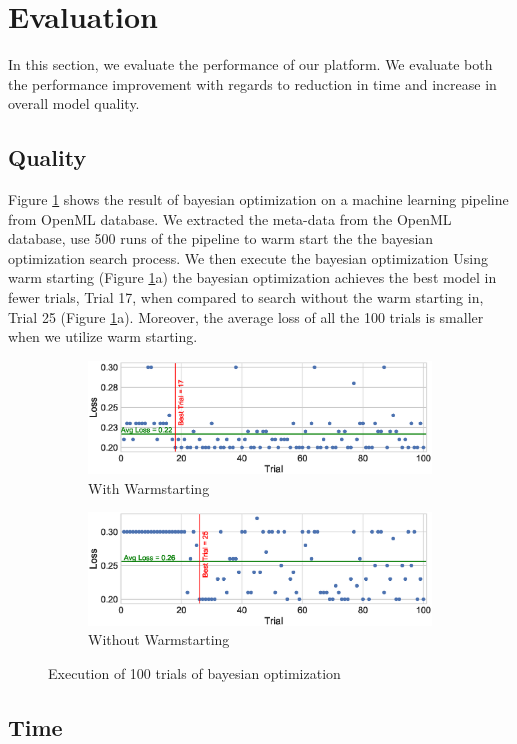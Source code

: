\section{Evaluation} \label{sec-evaluation} 
In this section, we evaluate the performance of our platform.
We evaluate both the performance improvement with regards to reduction in time and increase in overall model quality.

\subsection{Quality}
Figure \ref{fig-warm-vs-cold-task-31} shows the result of bayesian optimization on a machine learning pipeline from OpenML database.
We extracted the meta-data from the OpenML database, use 500 runs of the pipeline to warm start the the bayesian optimization search process.
We then execute the bayesian optimization 
Using warm starting (Figure \ref{fig-warm-vs-cold-task-31}a) the bayesian optimization achieves the best model in fewer trials, Trial 17, when compared to search without the warm starting in, Trial 25 (Figure \ref{fig-warm-vs-cold-task-31}a).
Moreover, the average loss of all the 100 trials is smaller when we utilize warm starting.
\begin{figure}[t]
\centering
	\begin{subfigure}{\columnwidth}
        \centering
        \includegraphics[width=\columnwidth]{../images/experiment-results/warm-starting-warm500-trials100-task31.eps}
        \caption{With Warmstarting}
    \end{subfigure}
    	\begin{subfigure}{\columnwidth}
        \centering
        \includegraphics[width=\columnwidth]{../images/experiment-results/cold-starting-trials100-task31.eps}
        \caption{Without Warmstarting}
        \label{fig-warm-vs-cold-task-31}
    \end{subfigure}

\caption{Execution of 100 trials of bayesian optimization}
\label{deployment-quality-figure}
\end{figure}

\subsection{Time}
